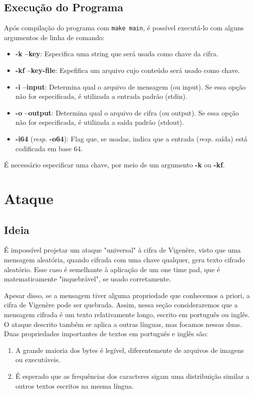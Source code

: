\documentclass[conference]{IEEEtran}
\begin{document}
\subsection{Execução do Programa}
\label{sec:exec-main}
Após compilação do programa com \verb|make main|, é possível executá-lo com
alguns argumentos de linha de comando:

\begin{itemize}
    \item \textbf{-k} \textbf{--key}: Especifica uma string que será usada como
        chave da cifra.
    \item \textbf{-kf} \textbf{--key-file}: Espefifica um arquivo cujo conteúdo
        será usado como chave.
    \item \textbf{-i} \textbf{--input}: Determina qual o arquivo de mensagem (ou
        input). Se essa opção não for especificada, é utilizada a entrada padrão
        (stdin).
    \item \textbf{-o} \textbf{--output}: Determina qual o arquivo de cifra (ou
        output). Se essa opção não for especificada, é utilizada a saída padrão
        (stdout).
    \item \textbf{-i64} (\textit{resp.} \textbf{-o64}): Flag que, se usadas,
        indica que a entrada (\textit{resp.} saída) está codificada em base 64.
\end{itemize}

É necessário especificar uma chave, por meio de um argumento \textbf{-k} ou
\textbf{-kf}.


\section{Ataque} %
\label{sec:attack}

\subsection{Ideia}
É impossível projetar um ataque "universal" à cifra de Vigenère, visto que uma
mensagem aleatória, quando cifrada com uma chave qualquer, gera texto cifrado
aleatório. Esse caso é semelhante à aplicação de um one time
pad\cite{one-time-pad}, que é matematicamente "inquebrável", se usado corretamente.

Apesar disso, se a mensagem tiver alguma propriedade que conhecemos a priori, a
cifra de Vigenère pode ser quebrada. Assim, nessa seção consideraremos que a
mensagem cifrada é um texto relativamente longo, escrito em português ou inglês.
O ataque descrito também se aplica a outras línguas, mas focamos nessas duas.
Duas propriedades importantes de textos em português e inglês são:
\begin{enumerate}
    \item A grande maioria dos bytes é legível, diferentemente de arquivos de
        imagens ou executáveis.
    \item É esperado que as frequências dos caracteres sigam uma distribuição
        similar a outros textos escritos na mesma língua.
\end{enumerate}
\end{document}
